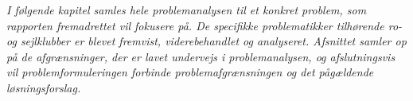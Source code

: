 \textit{I følgende kapitel samles hele problemanalysen til et konkret problem, som rapporten fremadrettet vil fokusere på. De specifikke problematikker tilhørende ro- og sejlklubber er blevet fremvist, viderebehandlet og analyseret. Afsnittet samler op på de afgrænsninger, der er lavet undervejs i problemanalysen, og afslutningsvis vil problemformuleringen forbinde problemafgrænsningen og det pågældende løsningsforslag.}
